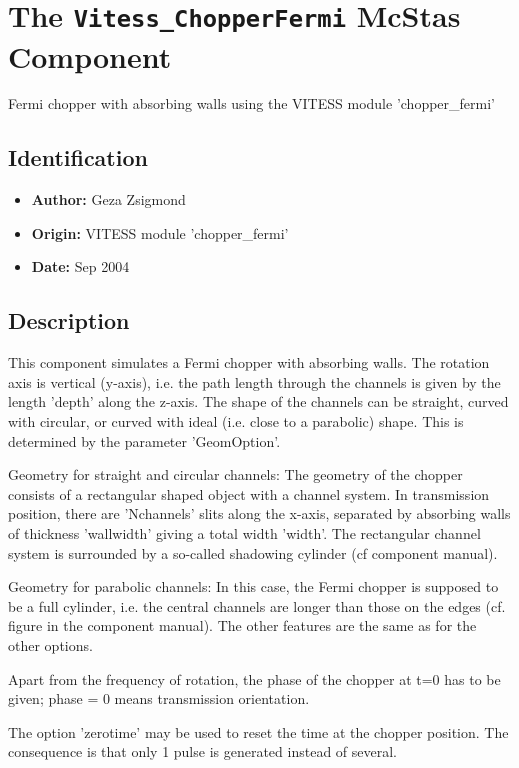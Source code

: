 \section{The \texttt{Vitess\_ChopperFermi} McStas Component}
Fermi chopper with absorbing walls using the VITESS module 'chopper\_fermi'

\subsection*{Identification}
\begin{itemize}
  \item \textbf{Author:} Geza Zsigmond
  \item \textbf{Origin:} VITESS module 'chopper\_fermi'
  \item \textbf{Date:} Sep 2004
\end{itemize}

\subsection*{Description}
This component simulates a Fermi chopper with absorbing walls. The rotation axis is vertical (y-axis), i.e. the path length through the channels is given by the length 'depth' along the z-axis. The shape of the channels can be straight, curved with circular, or curved with ideal (i.e. close to a parabolic) shape. This is determined by the parameter 'GeomOption'.

Geometry for straight and circular channels: The geometry of the chopper consists of a rectangular shaped object with a channel system. In transmission position, there are 'Nchannels' slits along the x-axis, separated by absorbing walls of thickness 'wallwidth' giving a total width 'width'. The rectangular channel system is surrounded by a so-called shadowing cylinder (cf component manual).

Geometry for parabolic channels: In this case, the Fermi chopper is supposed to be a full cylinder, i.e. the central channels are longer than those on the edges (cf. figure in the component manual). The other features are the same as for the other options.

Apart from the frequency of rotation, the phase of the chopper at t=0 has to be given; phase = 0 means transmission orientation.

The option 'zerotime' may be used to reset the time at the chopper position. The consequence is that only 1 pulse is generated instead of several.

